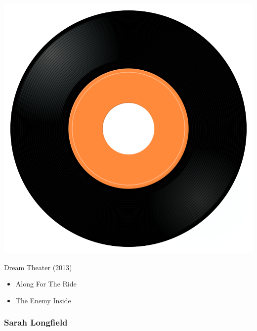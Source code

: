 \begin{minipage}[t]{0.25\textwidth}
\captionsetup{type=figure}
\includegraphics[width=\textwidth]{Images/cover.png}
\caption*{Dream Theater (2013)}
\end{minipage}
\begin{minipage}[t]{0.25\textwidth}\vspace{0pt}
\begin{itemize}[nosep,leftmargin=1em,labelwidth=*,align=left]
	\setlength{\itemsep}{0pt}
	\item Along For The Ride
	\item The Enemy Inside
\end{itemize}
\end{minipage}

\subsubsection{Sarah Longfield}

